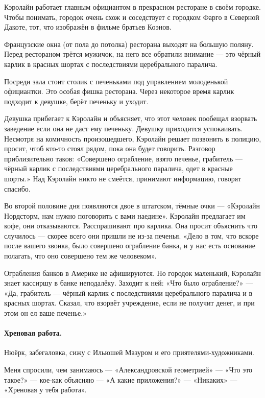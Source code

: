 \documentclass{book}
\begin{document}
Кэролайн работает главным официантом в прекрасном ресторане в своём городке.
Чтобы понимать, городок очень схож и соседствует с городком Фарго в Северной Дакоте, тот, что изображён в фильме братьев Коэнов.

Французские окна (от пола до потолка) ресторана выходят на большую поляну.
Перед рестораном трётся мужичок, на него все обратили внимание --- это чёрный карлик в красных шортах с последствиями церебрального паралича.

Посреди зала стоит столик с печеньками под управлением молоденькой официантки.
Это особая фишка ресторана.
Через некоторое время карлик подходит к девушке, берёт печеньку и уходит.

Девушка прибегает к Кэролайн и объясняет, что этот человек пообещал взорвать заведение если она не даст ему печеньку.
Девушку приходится успокаивать.
Несмотря на комичность произошедшего, Кэролайн решает позвонить в полицию, просит, чтоб кто-то стоял рядом, пока она будет говорить.
Разговор приблизительно таков:
«Совершено ограбление, взято печенье, грабитель --- чёрный карлик с последствиями церебрального паралича, одет в красные шорты.»
Над Кэролайн никто не смеётся, принимают информацию, говорят спасибо.

Во второй половине дня появляются двое в штатском, тёмные очки --- «Кэролайн Нордсторм, нам нужно поговорить с вами наедине».
Кэролайн предлагает им кофе, они отказываются.
Расспрашивают про карлика.
Она просит объяснить что случилось --- скорее всего они пришли не из-за печенья.
«Дело в том, что вскоре после вашего звонка, было совершено ограбление банка, и у нас есть основание полагать, что оно совершено тем же человеком».

Ограбления банков в Америке не афишируются.
Но городок маленький, Кэролайн знает кассиршу в банке неподалёку.
Заходит к ней: «Что было ограбление?» --- «Да, грабитель --- чёрный карлик с последствиями церебрального паралича и в красных шортах. Сказал, что взорвёт учреждение, если не получит денег, и
при этом он ел ваше печенье.»

\paragraph{Хреновая работа.}
Нюёрк, забегаловка, сижу с Ильюшей Мазуром и его приятелями-художниками.

Меня спросили, чем занимаюсь --- «Александровской геометрией» --- «Что это такое?» --- кое-как объясняю --- «А какие приложения?» --- «Никаких» --- «Хреновая у тебя работа».
\end{document}
